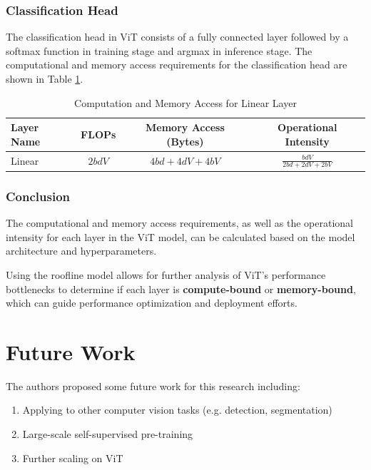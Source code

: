 \documentclass[12pt]{article}
\begin{document}
\subsubsection{Classification Head}

The classification head in ViT consists of a fully connected layer followed by a softmax function in training stage and argmax in inference stage. The computational and memory access requirements for the classification head are shown in Table \ref{tab:classification_head_analysis}.

\begin{table}
    \centering
    \renewcommand{\arraystretch}{1.7} %
    \begin{tabular}{lccc}
    \hline
    \textbf{Layer Name} & \textbf{FLOPs} & \textbf{Memory Access (Bytes)} & \textbf{Operational Intensity} \\
    \hline
    Linear & $2bdV$ & $4bd + 4dV + 4bV$ & $\frac{bdV}{2bd + 2dV + 2bV}$ \\
    \hline
    \end{tabular}
    \caption{Computation and Memory Access for Linear Layer}
    \label{tab:classification_head_analysis}
\end{table}

\subsubsection{Conclusion}

The computational and memory access requirements, as well as the operational intensity for each layer in the ViT model, can be calculated based on the model architecture and hyperparameters.

Using the roofline model allows for further analysis of ViT's performance bottlenecks to determine if each layer is \textbf{compute-bound} or \textbf{memory-bound}, which can guide performance optimization and deployment efforts.


\section{Future Work}

The authors proposed some future work for this research including:

\begin{enumerate}
    \item Applying to other computer vision tasks (e.g. detection, segmentation)
    \item Large-scale self-supervised pre-training
    \item Further scaling on ViT
\end{enumerate}
\end{document}
